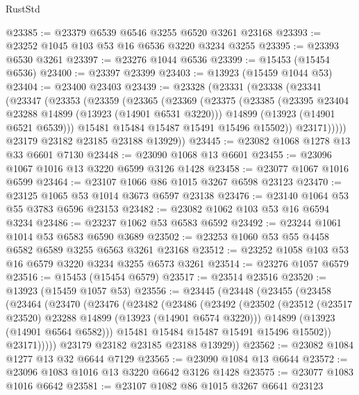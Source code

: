 \begin{lexlean}{RustStd}
\begin{coremodule}
@23385 := @23379 @6539 @6546 @3255 @6520 @3261 @23168
@23393 := @23252 @1045 @103 @53 @16 @6536 @3220 @3234 @3255
@23395 := @23393 @6530 @3261
@23397 := @23276 @1044 @6536
@23399 := @15453 (@15454 @6536)
@23400 := @23397 @23399
@23403 := @13923 (@15459 @1044 @53)
@23404 := @23400 @23403
@23439 := @23328
    (@23331
      (@23338
        (@23341
          (@23347
            (@23353
              (@23359
                (@23365
                  (@23369
                    (@23375
                      (@23385
                        (@23395 @23404 @23288 @14899 (@13923 (@14901 @6531 @3220)))
                        @14899
                        (@13923 (@14901 @6521 @6539)))
                      @15481
                      @15484
                      @15487
                      @15491
                      @15496
                      @15502))
                  @23171)))))
        @23179
        @23182
        @23185
        @23188
        @13929))
@23445 := @23082 @1068 @1278 @13 @33 @6601 @7130
@23448 := @23090 @1068 @13 @6601
@23455 := @23096 @1067 @1016 @13 @3220 @6599 @3126 @1428
@23458 := @23077 @1067 @1016 @6599
@23464 := @23107 @1066 @86 @1015 @3267 @6598 @23123
@23470 := @23125 @1065 @53 @1014 @3673 @6597 @23138
@23476 := @23140 @1064 @53 @55 @3783 @6596 @23153
@23482 := @23082 @1062 @103 @53 @16 @6594 @3234
@23486 := @23237 @1062 @53 @6583 @6592
@23492 := @23244 @1061 @1014 @53 @6583 @6590 @3689
@23502 := @23253 @1060 @53 @55 @4458 @6582 @6589 @3255 @6563 @3261 @23168
@23512 := @23252 @1058 @103 @53 @16 @6579 @3220 @3234 @3255 @6573 @3261
@23514 := @23276 @1057 @6579
@23516 := @15453 (@15454 @6579)
@23517 := @23514 @23516
@23520 := @13923 (@15459 @1057 @53)
@23556 := @23445
    (@23448
      (@23455
        (@23458
          (@23464
            (@23470
              (@23476
                (@23482
                  (@23486
                    (@23492
                      (@23502
                        (@23512 (@23517 @23520) @23288 @14899 (@13923 (@14901 @6574 @3220)))
                        @14899
                        (@13923 (@14901 @6564 @6582)))
                      @15481
                      @15484
                      @15487
                      @15491
                      @15496
                      @15502))
                  @23171)))))
        @23179
        @23182
        @23185
        @23188
        @13929))
@23562 := @23082 @1084 @1277 @13 @32 @6644 @7129
@23565 := @23090 @1084 @13 @6644
@23572 := @23096 @1083 @1016 @13 @3220 @6642 @3126 @1428
@23575 := @23077 @1083 @1016 @6642
@23581 := @23107 @1082 @86 @1015 @3267 @6641 @23123

\end{coremodule}
\end{lexlean}
